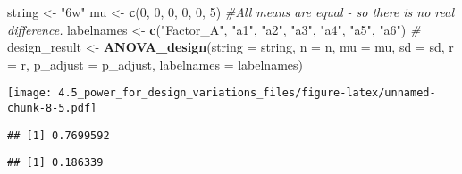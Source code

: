\documentclass[]{article}
\newenvironment{Shaded}{\begin{snugshade}}{\end{snugshade}}
\newcommand{\KeywordTok}[1]{\textcolor[rgb]{0.13,0.29,0.53}{\textbf{#1}}}
\newcommand{\DataTypeTok}[1]{\textcolor[rgb]{0.13,0.29,0.53}{#1}}
\newcommand{\DecValTok}[1]{\textcolor[rgb]{0.00,0.00,0.81}{#1}}
\newcommand{\StringTok}[1]{\textcolor[rgb]{0.31,0.60,0.02}{#1}}
\newcommand{\CommentTok}[1]{\textcolor[rgb]{0.56,0.35,0.01}{\textit{#1}}}
\newcommand{\OperatorTok}[1]{\textcolor[rgb]{0.81,0.36,0.00}{\textbf{#1}}}
\newcommand{\NormalTok}[1]{#1}
\begin{document}
\begin{Shaded}
\begin{Highlighting}[]
\NormalTok{string <-}\StringTok{ "6w"}
\NormalTok{mu <-}\StringTok{ }\KeywordTok{c}\NormalTok{(}\DecValTok{0}\NormalTok{, }\DecValTok{0}\NormalTok{, }\DecValTok{0}\NormalTok{, }\DecValTok{0}\NormalTok{, }\DecValTok{0}\NormalTok{, }\DecValTok{5}\NormalTok{) }\CommentTok{#All means are equal - so there is no real difference.}
\NormalTok{labelnames <-}\StringTok{ }\KeywordTok{c}\NormalTok{(}\StringTok{"Factor_A"}\NormalTok{, }\StringTok{"a1"}\NormalTok{, }\StringTok{"a2"}\NormalTok{, }\StringTok{"a3"}\NormalTok{, }\StringTok{"a4"}\NormalTok{, }\StringTok{"a5"}\NormalTok{, }\StringTok{"a6"}\NormalTok{) }\CommentTok{#}
\NormalTok{design_result <-}\StringTok{ }\KeywordTok{ANOVA_design}\NormalTok{(}\DataTypeTok{string =}\NormalTok{ string, }\DataTypeTok{n =}\NormalTok{ n, }\DataTypeTok{mu =}\NormalTok{ mu, }\DataTypeTok{sd =}\NormalTok{ sd, }\DataTypeTok{r =}\NormalTok{ r, }
                   \DataTypeTok{p_adjust =}\NormalTok{ p_adjust, }\DataTypeTok{labelnames =}\NormalTok{ labelnames)}
\end{Highlighting}
\end{Shaded}

\texttt{[image: 4.5\_power\_for\_design\_variations\_files/figure-latex/unnamed-chunk-8-5.pdf]}

\begin{Shaded}
\end{Shaded}

\begin{verbatim}
## [1] 0.7699592
\end{verbatim}

\begin{Shaded}
\end{Shaded}

\begin{verbatim}
## [1] 0.186339
\end{verbatim}

\begin{Shaded}
\end{Shaded}
\end{document}
